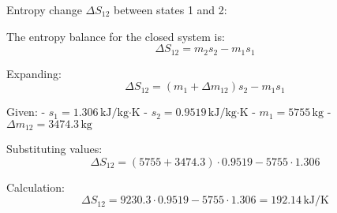 Entropy change \( \Delta S_{12} \) between states 1 and 2:  

The entropy balance for the closed system is:  
\[
\Delta S_{12} = m_2 s_2 - m_1 s_1
\]  

Expanding:  
\[
\Delta S_{12} = (m_1 + \Delta m_{12}) s_2 - m_1 s_1
\]  

Given:  
- \( s_1 = 1.306 \, \text{kJ/kg·K} \)  
- \( s_2 = 0.9519 \, \text{kJ/kg·K} \)  
- \( m_1 = 5755 \, \text{kg} \)  
- \( \Delta m_{12} = 3474.3 \, \text{kg} \)  

Substituting values:  
\[
\Delta S_{12} = (5755 + 3474.3) \cdot 0.9519 - 5755 \cdot 1.306
\]  

Calculation:  
\[
\Delta S_{12} = 9230.3 \cdot 0.9519 - 5755 \cdot 1.306 = 192.14 \, \text{kJ/K}
\]